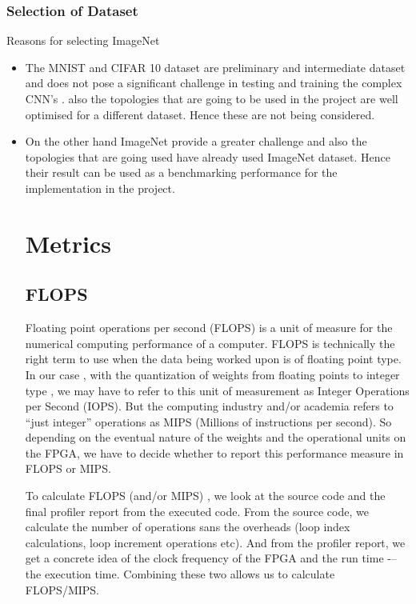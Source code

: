 \documentclass[titlepage]{report}
\begin{document}
\subsection{Selection of Dataset}
Reasons for selecting ImageNet
\begin{itemize}
    \item The MNIST and CIFAR 10 dataset are preliminary and intermediate dataset and does not pose a significant challenge in testing and training the complex CNN’s . also the topologies that are going to be used in the project are well optimised for a different dataset. Hence these are not being considered.
    \item On the other hand ImageNet provide a greater challenge and also the topologies that are going used have already used ImageNet dataset. Hence their result can be used as a benchmarking performance for the implementation in the project.




\chapter{Metrics}

\section{FLOPS}
Floating point operations per second (FLOPS) is a  unit of measure for the numerical computing performance of a computer. FLOPS is technically the right term to use when the data being worked upon is of floating point type.
In our case , with the quantization of weights from floating points  to integer type , we may have to refer to this unit of measurement as Integer Operations per Second (IOPS).
But the computing  industry and/or academia refers to ``just integer'' operations as MIPS (Millions of instructions per second). So depending on the eventual nature of the weights and the operational units on the FPGA,
we have to decide whether to report this performance measure in FLOPS or MIPS.  

To calculate FLOPS (and/or MIPS) , we look at the source code and the final profiler report from the executed code.
From the source code, we calculate the number of operations sans the overheads (loop index calculations, loop increment operations etc). And from the profiler report, we get a concrete idea of the clock frequency of the FPGA and the run time -– the execution time. Combining these two allows us to calculate  FLOPS/MIPS.



\end{itemize}
\end{document}
